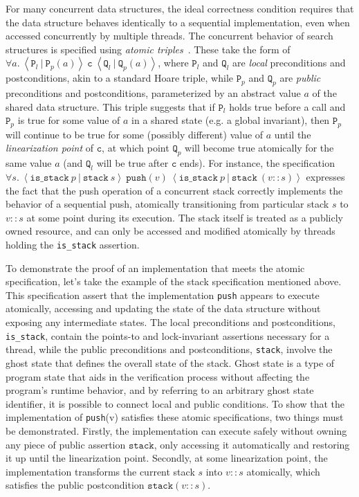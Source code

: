 \documentclass[a4paper,UKenglish,cleveref, autoref, thm-restate]{lipics-v2021}
\begin{document}
For many concurrent data structures, the ideal correctness condition requires that the data structure behaves identically to a sequential implementation, even when accessed concurrently by multiple threads. The concurrent behavior of search structures is specified using \emph{atomic triples}~\cite{tada}. These take the form of $\forall a.\ \left\langle \texttt{P}_l\ |\ \texttt{P}_p(a) \right\rangle\ \texttt{c}\ \left\langle \texttt{Q}_l\ |\ \texttt{Q}_p(a)\right\rangle$, where $\texttt{P}_l$ and $\texttt{Q}_l$ are \emph{local} preconditions and postconditions, akin to a standard Hoare triple, while $\texttt{P}_p$ and $\texttt{Q}_p$ are \emph{public} preconditions and postconditions, parameterized by an abstract value $a$ of the shared data structure. This triple suggests that if $\texttt{P}_l$ holds true before a call and $\texttt{P}_p$ is true for some value of $a$ in a shared state (e.g. a global invariant), then $\texttt{P}_p$ will continue to be true for some (possibly different) value of $a$ until the \emph{linearization point} of $\texttt{c}$, at which point $\texttt{Q}_p$ will become true atomically for the same value $a$ (and $\texttt{Q}_l$ will be true after $\texttt{c}$ ends). For instance, the specification
$\forall s.\ \left\langle \texttt{is\_stack}\ p\ |\ \texttt{stack}\ s\right\rangle\ \texttt{push}(v)\ \left\langle \texttt{is\_stack}\ p\ |\ \texttt{stack}\ (v::s)\right\rangle$
expresses the fact that the push operation of a concurrent stack correctly implements the behavior of a sequential push, atomically transitioning from particular stack $s$ to $v::s$ at some point during its execution. The stack itself is treated as a publicly owned resource, and can only be accessed and modified atomically by threads holding the \texttt{is\_stack} assertion.

To demonstrate the proof of an implementation that meets the atomic specification, let's take the example of the stack specification mentioned above. This specification assert that the implementation \texttt{push} appears to execute atomically, accessing and updating the state of the data structure without exposing any intermediate states. The local preconditions and postconditions, \texttt{is\_stack}, contain the points-to and lock-invariant assertions necessary for a thread, while the public preconditions and postconditions, \texttt{stack}, involve the ghost state that defines the overall state of the stack. Ghost state is a type of program state that aids in the verification process without affecting the program's runtime behavior, and by referring to an arbitrary ghost state identifier, it is possible to connect local and public conditions. To show that the implementation of \texttt{push}(v) satisfies these atomic specifications, two things must be demonstrated. Firstly, the implementation can execute safely without owning any piece of public assertion $\texttt{stack}$, only accessing it automatically and restoring it up until the linearization point. Secondly, at some linearization point, the implementation transforms the current stack $s$ into $v::s$ atomically, which satisfies the public postcondition $\texttt{stack}(v::s)$. 
\end{document}
